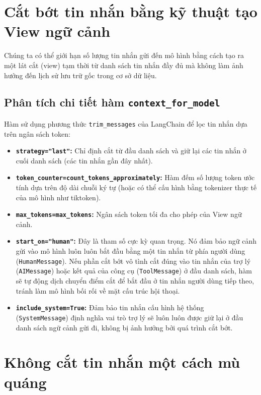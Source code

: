 \section{Cắt bớt tin nhắn bằng kỹ thuật tạo View ngữ cảnh}

Chúng ta có thể giới hạn số lượng tin nhắn gửi đến mô hình bằng cách tạo ra một lát cắt (view) tạm thời từ danh sách tin nhắn đầy đủ mà không làm ảnh hưởng đến lịch sử lưu trữ gốc trong cơ sở dữ liệu.

\begingroup

\endgroup

\subsection{Phân tích chi tiết hàm \texttt{context\_for\_model}}
Hàm sử dụng phương thức \texttt{trim\_messages} của LangChain để lọc tin nhắn dựa trên ngân sách token:
\begin{itemize}
  \item \textbf{\texttt{strategy="last"}:} Chỉ định cắt từ đầu danh sách và giữ lại các tin nhắn ở cuối danh sách (các tin nhắn gần đây nhất).
  \item \textbf{\texttt{token\_counter=count\_tokens\_approximately}:} Hàm đếm số lượng token ước tính dựa trên độ dài chuỗi ký tự (hoặc có thể cấu hình bằng tokenizer thực tế của mô hình như tiktoken).
  \item \textbf{\texttt{max\_tokens=max\_tokens}:} Ngân sách token tối đa cho phép của View ngữ cảnh.
  \item \textbf{\texttt{start\_on="human"}:} Đây là tham số cực kỳ quan trọng. Nó đảm bảo ngữ cảnh gửi vào mô hình luôn luôn bắt đầu bằng một tin nhắn từ phía người dùng (\texttt{HumanMessage}). Nếu phần cắt bớt vô tình cắt đúng vào tin nhắn của trợ lý (\texttt{AIMessage}) hoặc kết quả của công cụ (\texttt{ToolMessage}) ở đầu danh sách, hàm sẽ tự động dịch chuyển điểm cắt để bắt đầu ở tin nhắn người dùng tiếp theo, tránh làm mô hình bối rối về mặt cấu trúc hội thoại.
  \item \textbf{\texttt{include\_system=True}:} Đảm bảo tin nhắn cấu hình hệ thống (\texttt{SystemMessage}) định nghĩa vai trò trợ lý sẽ luôn luôn được giữ lại ở đầu danh sách ngữ cảnh gửi đi, không bị ảnh hưởng bởi quá trình cắt bớt.
\end{itemize}

\section{Không cắt tin nhắn một cách mù quáng}

